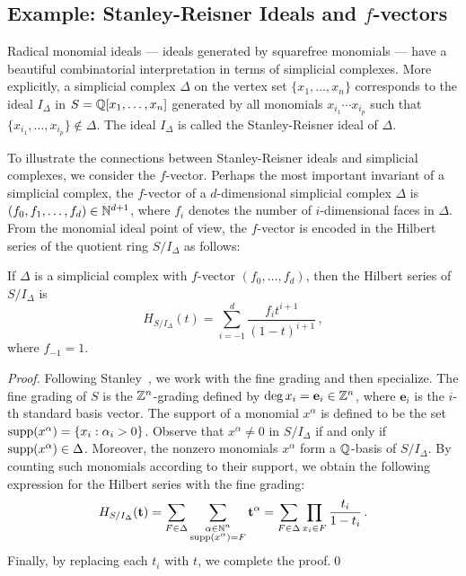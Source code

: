\subsection*{Example: Stanley-Reisner Ideals and $f$-vectors} 

Radical monomial ideals --- ideals generated by squarefree monomials
--- have a beautiful combinatorial interpretation in terms of
simplicial complexes.  More explicitly, a
simplicial complex $\Delta$ on the vertex set $\{ x_{1}, \dotsc, x_{n}
\}$ corresponds to the ideal $I_{\Delta}$ in $S = {\mathbb Q}[x_{1}, \dotsc,
x_{n}]$ generated by all monomials $x_{i_{1}} \dotsb x_{i_{p}}$ such
that $\{x_{i_{1}}, \dotsc, x_{i_{p}} \} \not\in \Delta$. The ideal
$I_{\Delta}$ is called the Stanley-Reisner ideal of $\Delta$.

To illustrate the connections between Stanley-Reisner ideals and
simplicial complexes, we consider the
$f$-vector.
Perhaps the most important invariant of a simplicial complex, the
$f$-vector of a $d$-dimensional simplicial complex $\Delta$ is
$(f_{0}, f_{1}, \dotsc, f_{d}) \in {\mathbb N}^{d+1}$, where $f_{i}$ denotes
the number of $i$-dimensional faces in $\Delta$.  From the monomial
ideal point of view, the $f$-vector is encoded in the Hilbert
series of the quotient ring $S/I_{\Delta}$ as
follows:

\begin{theorem}
If $\Delta$ is a simplicial complex with $f$-vector $(f_{0}, \dotsc,
f_{d})$, then the Hilbert series of $S / I_{\Delta}$ is
\[
H_{S/I_{\Delta}}(t) = \sum_{i=-1}^{d} \frac{f_{i}t^{i+1}}{(1-t)^{i+1}}
\, ,
\]
where $f_{-1} = 1$.
\end{theorem}

\begin{proof}
Following Stanley~\cite{MR98h:05001}, we work with the fine
grading and then
specialize.  The fine grading of $S$ is the ${\mathbb Z}^{n}$-grading
defined by $\deg x_{i} = \mathbf{e}_{i} \in {\mathbb Z}^{n}$, where
$\mathbf{e}_{i}$ is the $i$-th standard basis vector.  The
support of a monomial $x^{\alpha}$ is defined
to be the set $\operatorname{supp}(x^{\alpha}) = \{ x_{i} : \alpha_{i} > 0 \}$.
Observe that $x^{\alpha} \neq 0$ in $S / I_{\Delta}$ if and only if
$\operatorname{supp}(x^{\alpha}) \in \Delta$.  Moreover, the nonzero monomials
$x^{\alpha}$ form a ${\mathbb Q}$-basis of $S / I_{\Delta}$.  By counting
such monomials according to their support, we obtain the following
expression for the Hilbert series with the fine grading:
\[
H_{S/I_{\Delta}}(\mathbf{t}) = \sum_{F \in \Delta}
\sum_{\substack{\alpha \in {\mathbb N}^{n} \\ \operatorname{supp}(x^{\alpha}) = F}}
\mathbf{t}^{\alpha} = \sum_{F \in \Delta} \prod_{x_{i} \in F}
\frac{t_{i}}{1-t_{i}} \, .
\]
Finally, by replacing each $t_{i}$ with $t$, we complete the
proof.\qed
\end{proof}

